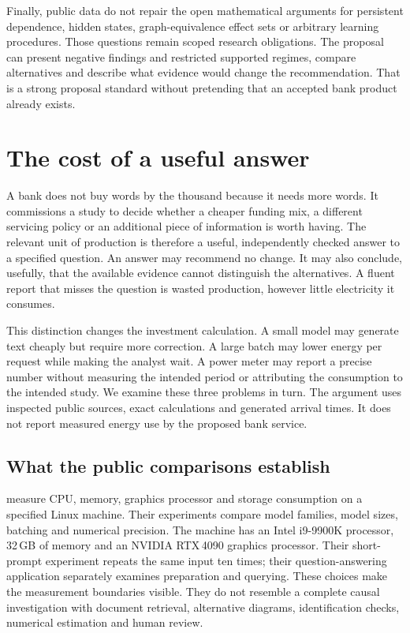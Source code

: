 Finally, public data do not repair the open mathematical arguments for
persistent dependence, hidden states, graph-equivalence effect sets or
arbitrary learning procedures. Those questions remain scoped research
obligations. The proposal can present negative findings and restricted
supported regimes, compare alternatives and describe what evidence would
change the recommendation. That is a strong proposal standard without
pretending that an accepted bank product already exists.




\section{The cost of a useful answer}
\label{closure:energy-study}

A bank does not buy words by the thousand because it needs more words. It
commissions a study to decide whether a cheaper funding mix, a different
servicing policy or an additional piece of information is worth having.
The relevant unit of production is therefore a useful, independently checked
answer to a specified question. An answer may recommend no change. It may
also conclude, usefully, that the available evidence cannot distinguish the
alternatives. A fluent report that misses the question is wasted production,
however little electricity it consumes.

This distinction changes the investment calculation. A small model may
generate text cheaply but require more correction. A large batch may lower
energy per request while making the analyst wait. A power meter may report a
precise number without measuring the intended period or attributing the
consumption to the intended study. We examine these three problems in turn.
The argument uses inspected public sources, exact calculations and generated
arrival times. It does not report measured energy use by the proposed bank
service.

\subsection{What the public comparisons establish}

\citet{closureArgerich2024} measure CPU, memory, graphics processor and
storage consumption on a specified Linux machine. Their experiments compare
model families, model sizes, batching and numerical precision. The machine
has an Intel i9-9900K processor, 32\,GB of memory and an NVIDIA RTX\,4090
graphics processor. Their short-prompt experiment repeats the same input ten
times; their question-answering application separately examines preparation
and querying. These choices make the measurement boundaries visible. They
do not resemble a complete causal investigation with document retrieval,
alternative diagrams, identification checks, numerical estimation and
human review.

